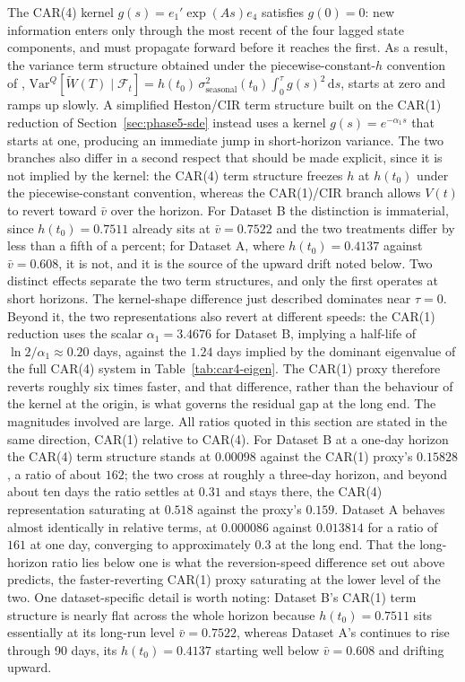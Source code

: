 The CAR(4) kernel $g(s) = e_1' \exp(As)e_4$ satisfies $g(0) = 0$: new information enters only through the most recent of the four lagged state components, and must propagate forward before it reaches the first. As a result, the variance term structure obtained under the piecewise-constant-$h$ convention of \citet{Tol1997}, $\mathrm{Var}^Q[\widetilde W(T)\mid\mathcal F_t] = h(t_0)\,\sigma^2_{\text{seasonal}}(t_0) \int_0^\tau g(s)^2\,\mathrm ds$, starts at zero and ramps up slowly. A simplified Heston/CIR term structure built on the CAR(1) reduction of Section~\ref{sec:phase5-sde} instead uses a kernel $g(s) = e^{-\alpha_1 s}$ that starts at one, producing an immediate jump in short-horizon variance. The two branches also differ in a second respect that should be made explicit, since it is not implied by the kernel: the CAR(4) term structure freezes $h$ at $h(t_0)$ under the piecewise-constant convention, whereas the CAR(1)/CIR branch allows $V(t)$ to revert toward $\bar v$ over the horizon. For Dataset B the distinction is immaterial, since $h(t_0) = 0.7511$ already sits at $\bar v = 0.7522$ and the two treatments differ by less than a fifth of a percent; for Dataset A, where $h(t_0) = 0.4137$ against $\bar v = 0.608$, it is not, and it is the source of the upward drift noted below. Two distinct effects separate the two term structures, and only the first operates at short horizons. The kernel-shape difference just described dominates near $\tau = 0$. Beyond it, the two representations also revert at different speeds: the CAR(1) reduction uses the scalar $\alpha_1 = 3.4676$ for Dataset B, implying a half-life of $\ln 2/\alpha_1 \approx 0.20$ days, against the $1.24$ days implied by the dominant eigenvalue of the full CAR(4) system in Table~\ref{tab:car4-eigen}. The CAR(1) proxy therefore reverts roughly six times faster, and that difference, rather than the behaviour of the kernel at the origin, is what governs the residual gap at the long end. The magnitudes involved are large. All ratios quoted in this section are stated in the same direction, CAR(1) relative to CAR(4). For Dataset B at a one-day horizon the CAR(4) term structure stands at $0.00098$ against the CAR(1) proxy's $0.15828$, a ratio of about $162$; the two cross at roughly a three-day horizon, and beyond about ten days the ratio settles at $0.31$ and stays there, the CAR(4) representation saturating at $0.518$ against the proxy's $0.159$. Dataset A behaves almost identically in relative terms, at $0.000086$ against $0.013814$ for a ratio of $161$ at one day, converging to approximately $0.3$ at the long end. That the long-horizon ratio lies below one is what the reversion-speed difference set out above predicts, the faster-reverting CAR(1) proxy saturating at the lower level of the two. One dataset-specific detail is worth noting: Dataset B's CAR(1) term structure is nearly flat across the whole horizon because $h(t_0) = 0.7511$ sits essentially at its long-run level $\bar v = 0.7522$, whereas Dataset A's continues to rise through 90 days, its $h(t_0) = 0.4137$ starting well below $\bar v = 0.608$ and drifting upward.

